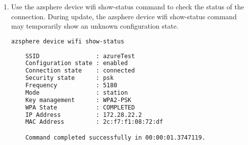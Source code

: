 \begin{enumerate}
    \item Use the azsphere device wifi show-status command to check the status of the connection. During update, the azsphere device wifi show-status command may temporarily show an unknown configuration state. 
    \begin{lstlisting}[language=bash]
    azsphere device wifi show-status
    
    SSID                : azureTest
    Configuration state : enabled
    Connection state    : connected
    Security state      : psk
    Frequency           : 5180
    Mode                : station
    Key management      : WPA2-PSK
    WPA State           : COMPLETED
    IP Address          : 172.28.22.2
    MAC Address         : 2c:f7:f1:08:72:df

    Command completed successfully in 00:00:01.3747119.
    \end{lstlisting}
\end{enumerate}


